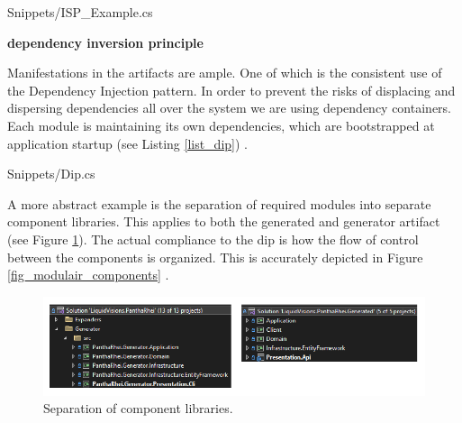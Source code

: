 
    {Snippets/ISP_Example.cs}

    \textbf{dependency inversion principle}
    
Manifestations in the artifacts are ample. One of which is the consistent use of the
Dependency Injection pattern. In order to prevent the risks of displacing and dispersing
dependencies all over the system \parencite[214]{mannaert_normalized_2016} we are using
dependency containers. Each module is maintaining its own dependencies, which are
bootstrapped at application startup (see Listing \ref{list_dip})
\parencite{koks_generator_2023}.


    {Snippets/Dip.cs}

A more abstract example is the separation of required modules into separate component
libraries. This applies to both the generated and generator artifact (see Figure
\ref{fig_solutions}). The actual compliance to the \gls{dip} is how the flow of control
between the components is organized. This is accurately depicted in Figure
\ref{fig_modulair_components} .

\begin{figure}[H]
    \centering
    \includegraphics[width=1\textwidth]{figures/solutions.pdf}
    \caption[Separation of component libraries]{Separation of component libraries.}
    \label{fig_solutions}
\end{figure}